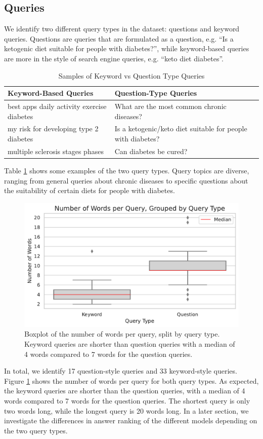 \subsection{Queries}
We identify two different query types in the dataset: questions and keyword queries.
Questions are queries that are formulated as a question, e.g. ``Is a ketogenic diet suitable for people with diabetes?'', while keyword-based queries are more in the style of search engine queries, e.g. ``keto diet diabetes''.
\begin{table}[tb]
\centering
\begin{tabularx}{\textwidth}{XX}
\hline
\textbf{Keyword-Based Queries} & \textbf{Question-Type Queries} \\
\hline
best apps daily activity exercise diabetes & What are the most common chronic diseases? \\
\hline
my risk for developing type 2 diabetes & Is a ketogenic/keto diet suitable for people with diabetes? \\
\hline
multiple sclerosis stages phases & Can diabetes be cured? \\
\hline
\end{tabularx}
\caption{Samples of Keyword vs Question Type Queries}
\label{table:querie-samples}
\end{table}
Table \ref{table:querie-samples} shows some examples of the two query types.
Query topics are diverse, ranging from general queries about chronic diseases to specific questions about the suitability of certain diets for people with diabetes.

\begin{figure}
\centering
\includegraphics[width=\textwidth]{images/num_words_per_query.pdf}
\caption{Boxplot of the number of words per query, split by query type. Keyword queries are shorter than question queries with a median of 4 words compared to 7 words for the question queries.}
\label{fig:num_words_per_query}
\end{figure}
In total, we identify 17 question-style queries and 33 keyword-style queries.
Figure \ref{fig:num_words_per_query} shows the number of words per query for both query types.
As expected, the keyword queries are shorter than the question queries, with a median of 4 words compared to 7 words for the question queries.
The shortest query is only two words long, while the longest query is 20 words long.
In a later section, we investigate the differences in answer ranking of the different models depending on the two query types.
